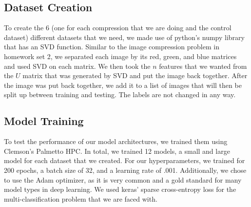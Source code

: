 \documentclass{article}
\begin{document}
\subsection{Dataset Creation}

To create the 6 (one for each compression that we are doing and the control dataset) different datasets that we need, we made use of python's numpy library that has an SVD function. Similar to the image compression problem in homework set 2, we separated each image by its red, green, and blue matrices and used SVD on each matrix. We then took the $n$ features that we wanted from the $U$ matrix that was generated by SVD and put the image back together. After the image was put back together, we add it to a list of images that will then be split up between training and testing. The labels are not changed in any way.

\subsection{Model Training}

To test the performance of our model architectures, we trained them using Clemson's Palmetto HPC. In total, we trained 12 models, a small and large model for each dataset that we created. For our hyperparameters, we trained for 200 epochs, a batch size of 32, and a learning rate of .001. Additionally, we chose to use the Adam optimizer, as it is very common and a gold standard for many model types in deep learning. We used keras' sparse cross-entropy loss for the multi-classification problem that we are faced with.
\end{document}
